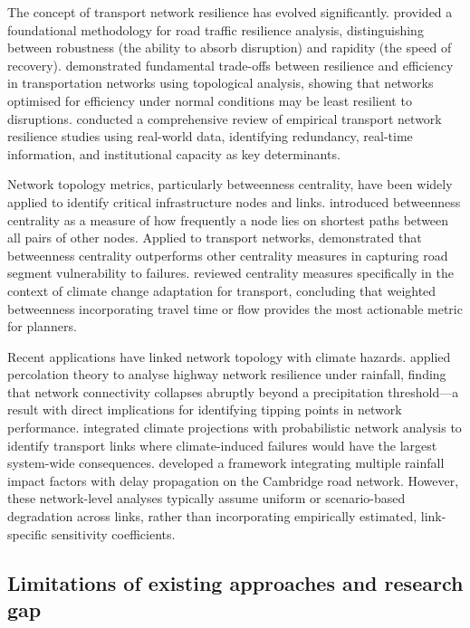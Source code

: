\documentclass[review]{elsarticle}
\begin{document}
The concept of transport network resilience has evolved significantly. \citet{calvert2018methodology} provided a foundational methodology for road traffic resilience analysis, distinguishing between robustness (the ability to absorb disruption) and rapidity (the speed of recovery). \citet{ganin2017resilience} demonstrated fundamental trade-offs between resilience and efficiency in transportation networks using topological analysis, showing that networks optimised for efficiency under normal conditions may be least resilient to disruptions. \citet{bergantino2024assessing} conducted a comprehensive review of empirical transport network resilience studies using real-world data, identifying redundancy, real-time information, and institutional capacity as key determinants.

Network topology metrics, particularly betweenness centrality, have been widely applied to identify critical infrastructure nodes and links. \citet{freeman1977centrality} introduced betweenness centrality as a measure of how frequently a node lies on shortest paths between all pairs of other nodes. Applied to transport networks, \citet{wassmer2024resilience} demonstrated that betweenness centrality outperforms other centrality measures in capturing road segment vulnerability to failures. \citet{stamos2023centrality} reviewed centrality measures specifically in the context of climate change adaptation for transport, concluding that weighted betweenness incorporating travel time or flow provides the most actionable metric for planners.

Recent applications have linked network topology with climate hazards. \citet{li2024percolation} applied percolation theory to analyse highway network resilience under rainfall, finding that network connectivity collapses abruptly beyond a precipitation threshold---a result with direct implications for identifying tipping points in network performance. \citet{farahmand2024integrating} integrated climate projections with probabilistic network analysis to identify transport links where climate-induced failures would have the largest system-wide consequences. \citet{liu2026extreme} developed a framework integrating multiple rainfall impact factors with delay propagation on the Cambridge road network. However, these network-level analyses typically assume uniform or scenario-based degradation across links, rather than incorporating empirically estimated, link-specific sensitivity coefficients.

\subsection{Limitations of existing approaches and research gap}
\label{sec:lit:gap}
\end{document}
